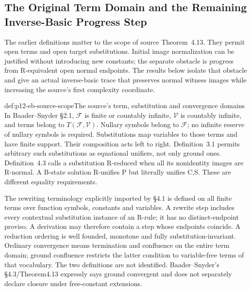 \subsection{The Original Term Domain and the Remaining Inverse-Basic Progress Step}
\label{sec:p12-equational-basic-completeness}

The earlier definitions matter to the scope of source Theorem~4.13.
They permit open terms and open target substitutions. Initial image
normalization can be justified without introducing new constants;
the separate obstacle is progress from R-equivalent open normal
endpoints. The results below isolate that obstacle and give an actual
inverse-basic trace that preserves normal witness images while
increasing the source's first complexity coordinate.
\cite[\S2.1, pp.~451--452; \S4.3, pp.~495--498]{BaaderSnyder2001}

\begin{hbdefinition}{def:p12-eb-source-scope}{The source's term, substitution and convergence domains}
In Baader--Snyder \S2.1, \(\mathcal F\) is finite or countably
infinite, \(\mathcal V\) is countably infinite, and terms belong to
\(T(\mathcal F,\mathcal V)\). Nullary symbols belong to
\(\mathcal F\); no infinite reserve of nullary symbols is required.
Substitutions map variables to those terms and have finite support.
Their composition acts left to right. Definition~3.1 permits arbitrary
such substitutions as equational unifiers, not only ground ones.
Definition~4.3 calls a substitution R-reduced when all its nonidentity
images are R-normal. A B-state solution R-unifies P but literally
unifies C,S. These are different equality requirements.
\cite[pp.~451--452,469--470,489,495]{BaaderSnyder2001}

The rewriting terminology explicitly imported by \S4.1 is defined
on all finite terms over function symbols, constants and variables.
A rewrite step includes every contextual substitution instance of
an R-rule; it has no distinct-endpoint proviso. A derivation may
therefore contain a step whose endpoints coincide. A reduction
ordering is well founded, monotone and fully substitution-invariant.
Ordinary convergence means termination and confluence on the entire
term domain; ground confluence restricts the latter condition to
variable-free terms of that vocabulary. The two definitions are
not identified. Baader--Snyder's \S4.3/Theorem4.13 expressly says
ground convergent and does not separately declare closure under
free-constant extensions.
\cite[\S2, pp.~541--543; Definitions4.3--4.5, pp.~546--547;
Definitions5.5--5.6, pp.~560--561]{DershowitzPlaisted2001Rewriting}
\cite[pp.~488,496--497]{BaaderSnyder2001}
\end{hbdefinition}

